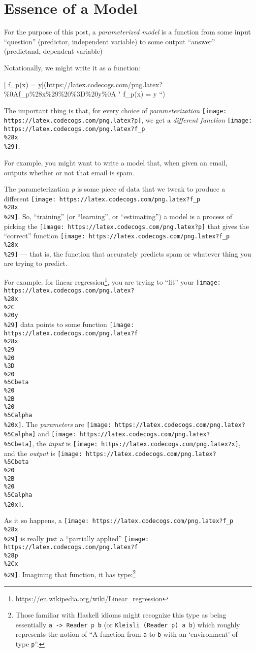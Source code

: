 \documentclass[]{article}
\renewcommand{\href}[2]{#2\footnote{\url{#1}}}
\begin{document}
\hypertarget{essence-of-a-model}{%
\section{Essence of a Model}\label{essence-of-a-model}}

For the purpose of this post, a \emph{parameterized model} is a function from
some input ``question'' (predictor, independent variable) to some output
``answer'' (predictand, dependent variable)

Notationally, we might write it as a function:

{[} f\_p(x) =
y{]}(https://latex.codecogs.com/png.latex?\%0Af\_p\%28x\%29\%20\%3D\%20y\%0A "
f\_p(x) = y ``)

The important thing is that, for every choice of \emph{parameterization}
\texttt{[image: https://latex.codecogs.com/png.latex?p]}, we get a
\emph{different function}
\texttt{[image: https://latex.codecogs.com/png.latex?f\_p\\\%28x\\\%29]}.

For example, you might want to write a model that, when given an email, outputs
whether or not that email is spam.

The parameterization \emph{p} is some piece of data that we tweak to produce a
different \texttt{[image: https://latex.codecogs.com/png.latex?f\_p\\\%28x\\\%29]}.
So, ``training'' (or ``learning'', or ``estimating'') a model is a process of
picking the \texttt{[image: https://latex.codecogs.com/png.latex?p]} that gives
the ``correct'' function
\texttt{[image: https://latex.codecogs.com/png.latex?f\_p\\\%28x\\\%29]} --- that is,
the function that accurately predicts spam or whatever thing you are trying to
predict.

For example, for \href{https://en.wikipedia.org/wiki/Linear_regression}{linear
regression}, you are trying to ``fit'' your
\texttt{[image: https://latex.codecogs.com/png.latex?\\\%28x\\\%2C\\\%20y\\\%29]} data
points to some function
\texttt{[image: https://latex.codecogs.com/png.latex?f\\\%28x\\\%29\\\%20\\\%3D\\\%20\\\%5Cbeta\\\%20\\\%2B\\\%20\\\%5Calpha\\\%20x]}.
The \emph{parameters} are
\texttt{[image: https://latex.codecogs.com/png.latex?\\\%5Calpha]} and
\texttt{[image: https://latex.codecogs.com/png.latex?\\\%5Cbeta]}, the
\emph{input} is \texttt{[image: https://latex.codecogs.com/png.latex?x]}, and
the \emph{output} is
\texttt{[image: https://latex.codecogs.com/png.latex?\\\%5Cbeta\\\%20\\\%2B\\\%20\\\%5Calpha\\\%20x]}.

As it so happens, a
\texttt{[image: https://latex.codecogs.com/png.latex?f\_p\\\%28x\\\%29]} is really
just a ``partially applied''
\texttt{[image: https://latex.codecogs.com/png.latex?f\\\%28p\\\%2Cx\\\%29]}.
Imagining that function, it has type:\footnote{Those familiar with Haskell
  idioms might recognize this type as being essentially
  \texttt{a\ -\textgreater{}\ Reader\ p\ b} (or
  \texttt{Kleisli\ (Reader\ p)\ a\ b}) which roughly represents the notion of
  ``A function from \texttt{a} to \texttt{b} with an `environment' of type
  \texttt{p}''.}
\end{document}
